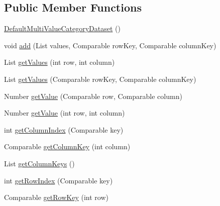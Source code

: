 \subsection*{Public Member Functions}
\begin{DoxyCompactItemize}
\item 
\mbox{\hyperlink{classorg_1_1jfree_1_1data_1_1statistics_1_1_default_multi_value_category_dataset_ac6e64aa39f3330f9acb5f36bfce71458}{Default\+Multi\+Value\+Category\+Dataset}} ()
\item 
void \mbox{\hyperlink{classorg_1_1jfree_1_1data_1_1statistics_1_1_default_multi_value_category_dataset_ae741f8745061f8af1d654172399f45c6}{add}} (List values, Comparable row\+Key, Comparable column\+Key)
\item 
List \mbox{\hyperlink{classorg_1_1jfree_1_1data_1_1statistics_1_1_default_multi_value_category_dataset_af4ab5f0a4363c4e57bbf17921326bc3e}{get\+Values}} (int row, int column)
\item 
List \mbox{\hyperlink{classorg_1_1jfree_1_1data_1_1statistics_1_1_default_multi_value_category_dataset_aeb92fa85eb9b8f780c0b62500989ed22}{get\+Values}} (Comparable row\+Key, Comparable column\+Key)
\item 
Number \mbox{\hyperlink{classorg_1_1jfree_1_1data_1_1statistics_1_1_default_multi_value_category_dataset_ad4f8c7103acbcdf5fb2ce723d4ea360b}{get\+Value}} (Comparable row, Comparable column)
\item 
Number \mbox{\hyperlink{classorg_1_1jfree_1_1data_1_1statistics_1_1_default_multi_value_category_dataset_ada4d7993c0081ec75a774e5fa7e58255}{get\+Value}} (int row, int column)
\item 
int \mbox{\hyperlink{classorg_1_1jfree_1_1data_1_1statistics_1_1_default_multi_value_category_dataset_a1645d262991fd239a0a847d117dd975d}{get\+Column\+Index}} (Comparable key)
\item 
Comparable \mbox{\hyperlink{classorg_1_1jfree_1_1data_1_1statistics_1_1_default_multi_value_category_dataset_a7ee310334e29539ed7ccf42a63323602}{get\+Column\+Key}} (int column)
\item 
List \mbox{\hyperlink{classorg_1_1jfree_1_1data_1_1statistics_1_1_default_multi_value_category_dataset_aa5e1211afffe37c4d8d6f25e0da9f045}{get\+Column\+Keys}} ()
\item 
int \mbox{\hyperlink{classorg_1_1jfree_1_1data_1_1statistics_1_1_default_multi_value_category_dataset_a019bd8dc0f4782a42bd52e161f3913ba}{get\+Row\+Index}} (Comparable key)
\item 
Comparable \mbox{\hyperlink{classorg_1_1jfree_1_1data_1_1statistics_1_1_default_multi_value_category_dataset_a0dcf3b92e34fabc4322b887c083e790a}{get\+Row\+Key}} (int row)

\end{DoxyCompactItemize}

